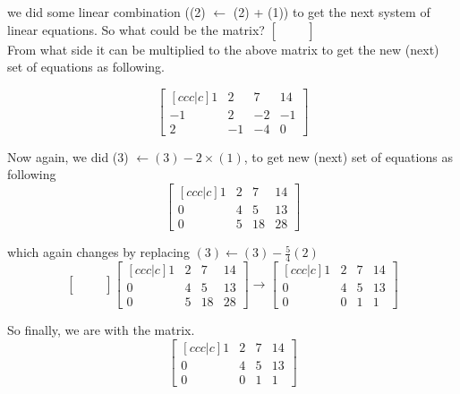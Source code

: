 \documentclass{article}
\begin{document}
we did some linear combination ((2) $\longleftarrow$ (2) + (1)) to get the next system of linear equations. So what could be the matrix?
\begin{math}
\begin{bmatrix}
    & & \\
    & & \\
    & &
\end{bmatrix}
\end{math}\\
From what side it can be multiplied to the above matrix to get the new (next) set of equations as following.

\[
\begin{bmatrix}[ccc|c]
    1 & 2 & 7 & 14\\
    -1 & 2 & -2 & -1 \\
    2 & -1 & -4 & 0
\end{bmatrix}
\]

Now again, we did (3) $\longleftarrow (3) - 2\times (1) $, to get new (next) set of equations as following
\[
\begin{bmatrix}[ccc|c]
    1 & 2 & 7 & 14\\
    0 & 4 & 5 & 13 \\
    0 & 5 & 18 & 28
\end{bmatrix}
\]

which again changes by replacing $(3) \longleftarrow (3) - \frac{5}{4}(2) $
\[
\begin{bmatrix}
    & & \\
    & & \\
    & &
\end{bmatrix}
\begin{bmatrix}[ccc|c]
    1 & 2 & 7 & 14\\
    0 & 4 & 5 & 13 \\
    0 & 5 & 18 & 28
\end{bmatrix} \longrightarrow \begin{bmatrix}[ccc|c]
                                1 & 2 & 7 & 14\\
                                0 & 4 & 5 & 13\\
                                0 & 0 & 1 & 1
                              \end{bmatrix}
\]


So finally, we are with the matrix.\\


\begin{displaymath} \tag{1}
\begin{bmatrix}[ccc|c] 
1 & 2 & 7 & 14 \\
0 & 4 & 5 & 13 \\
0 & 0 & 1 & 1
\end{bmatrix}
\end{displaymath}\\
\end{document}

